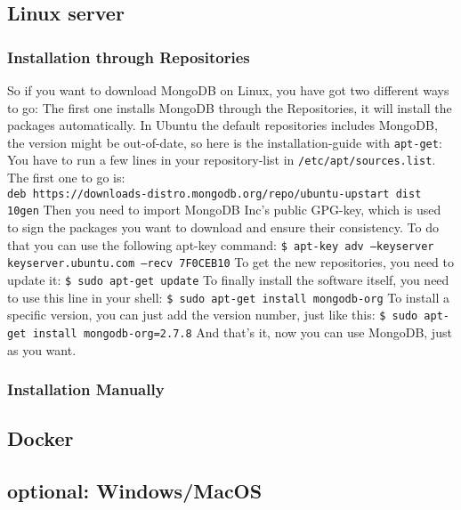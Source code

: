 \subsection{Linux server}

\subsubsection{Installation through Repositories}
So if you want to download MongoDB on Linux, you have got two different ways to go:
The first one installs MongoDB through the Repositories, it will install the packages automatically. 
In Ubuntu the default repositories includes MongoDB, the version might be out-of-date, so here is the installation-guide with \texttt{apt-get}:
You have to run a few lines in your repository-list in \texttt{/etc/apt/sources.list}.
\\
The first one to go is: \\
\texttt{deb https://downloads-distro.mongodb.org/repo/ubuntu-upstart dist 10gen}        %
Then you need to import MongoDB Inc's public GPG-key, which is used to sign the packages you want to download and ensure their consistency. 
To do that you can use the following apt-key command: 
\texttt{\$ apt-key adv --keyserver keyserver.ubuntu.com --recv 7F0CEB10}
To get the new repositories, you need to update it:
\texttt{\$ sudo apt-get update}
To finally install the software itself, you need to use this line in your shell:
\texttt{\$ sudo apt-get install mongodb-org}
To install a specific version, you can just add the version number, just like this:
\texttt{\$ sudo apt-get install mongodb-org=2.7.8}
And that's it, now you can use MongoDB, just as you want\parencite{Membrey2014}.

\subsubsection{Installation Manually}



\subsection{Docker}

\subsection{optional: Windows/MacOS}


\parencite{Mongo-Installation}

\parencite[p. ]{Subramanian2019}